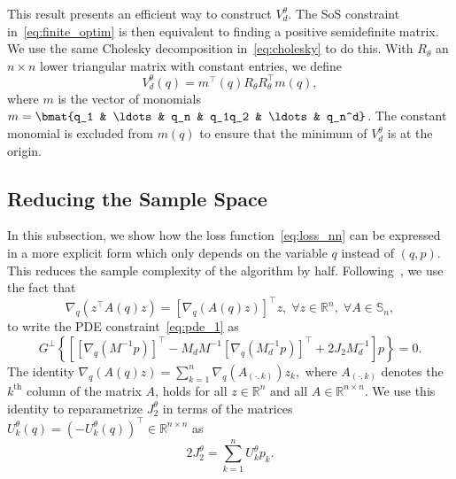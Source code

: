 This result presents an efficient way to construct $V_d^\theta$. The SoS
constraint in~\eqref{eq:finite_optim} is then equivalent to finding a positive
semidefinite matrix. We use the same Cholesky decomposition
in~\eqref{eq:cholesky} to do this. With $R_\theta$ an $n \times n$ lower
triangular matrix with constant entries, we define 
%
\begin{equation}
    V_d^\theta(q) = m^\top(q) R_\theta R_\theta^\top m(q),
    \label{eq:sos_Vd}
\end{equation}
%
where $m$ is the vector of monomials $m = \bmat{q_1 & \ldots & q_n &
q_1q_2 & \ldots & q_n^d}$. The constant monomial is excluded from $m(q)$ to
ensure that the minimum of $V_d^\theta$ is at the origin.



\subsection{Reducing the Sample Space}
\label{ssec:sample}

%
In this subsection, we show how the loss function~\eqref{eq:loss_nn} can be
expressed in a more explicit form which only depends on the variable $q$ instead
of $(q,p)$. This reduces the sample complexity of the algorithm by half. 
Following~\cite{ortega2002stabilization}, we use the fact that
%
\[
    \nabla_q \left(z^\top A(q) z \right) = 
    \left[ \nabla_q \left( A(q)z \right)\right]^\top z,
    \; \forall z \in \mathbb{R}^n, \; \forall A \in \mathbb{S}_n,
\]
%
to write the PDE constraint~\eqref{eq:pde_1} as
%
\begin{equation*}
    G^\perp \left\{ \left[
        \left[ \nabla_q \left( M^{-1} p \right) \right]^\top - 
        M_d M^{-1} \left[ \nabla_q \left( M_d^{-1} p \right) \right]^\top + 
        2 J_2 M_d^{-1} 
    \right] p \right\}= 0.
\end{equation*}
%
The identity
%
$
    \nabla_q \left( A(q) z \right) = \sum_{k=1}^n \nabla_q \left( A_{(\cdot, k)} \right) z_k,
$
%
where $A_{(\cdot, k)}$ denotes the $k^\textrm{th}$ column of the matrix $A$,
holds for all $z \in \mathbb{R}^n$ and all $A \in \mathbb{R}^{n \times n}$. We
use this identity to reparametrize $J_2^\theta$ in terms of the matrices $U_k^\theta(q) =
\left(-U_k^\theta (q)\right)^\top \in \mathbb{R}^{n \times n}$ as
%
\[
    2 J_2^\theta = \sum_{k=1}^n U^\theta_k p_k.
\]

